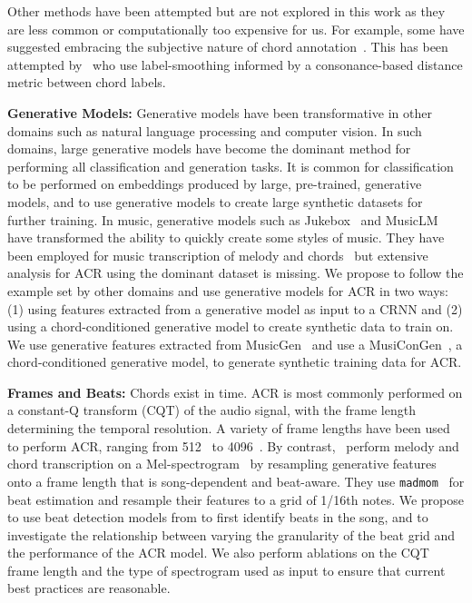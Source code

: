 Other methods have been attempted but are not explored in this work as they are less common or computationally too expensive for us. For example, some have suggested embracing the subjective nature of chord annotation~\cite{FourTimelyInsights,20YearsofACR}. This has been attempted by~\cite{discordharmony} who use label-smoothing informed by a consonance-based distance metric between chord labels.

\textbf{Generative Models:} Generative models have been transformative in other domains such as natural language processing and computer vision. In such domains, large generative models have become the dominant method for performing all classification and generation tasks. It is common for classification to be performed on embeddings produced by large, pre-trained, generative models, and to use generative models to create large synthetic datasets for further training. In music, generative models such as Jukebox~\cite{Jukebox} and MusicLM~\cite{MusicLM} have transformed the ability to quickly create some styles of music. They have been employed for music transcription of melody and chords~\cite{MelodyTranscriptionViaGenerativePreTraining} but extensive analysis for ACR using the dominant dataset is missing. We propose to follow the example set by other domains and use generative models for ACR in two ways: (1) using features extracted from a generative model as input to a CRNN and (2) using a chord-conditioned generative model to create synthetic data to train on. We use generative features extracted from MusicGen~\cite{MusicGen} and use a MusiConGen~\cite{MusiConGen}, a chord-conditioned generative model, to generate synthetic training data for ACR.

\textbf{Frames and Beats:} Chords exist in time. ACR is most commonly performed on a constant-Q transform (CQT) of the audio signal, with the frame length determining the temporal resolution. A variety of frame lengths have been used to perform ACR, ranging from 512~\cite{ACRLargeVocab1} to 4096~\cite{StructuredTraining}. By contrast,~\cite{MelodyTranscriptionViaGenerativePreTraining} perform melody and chord transcription on a Mel-spectrogram~\cite{MelScale} by resampling generative features onto a frame length that is song-dependent and beat-aware. They use \texttt{madmom}~\cite{madmom} for beat estimation and resample their features to a grid of 1/16th notes. We propose to use beat detection models from \cite{madmom} to first identify beats in the song, and to investigate the relationship between varying the granularity of the beat grid and the performance of the ACR model. We also perform ablations on the CQT frame length and the type of spectrogram used as input to ensure that current best practices are reasonable.
